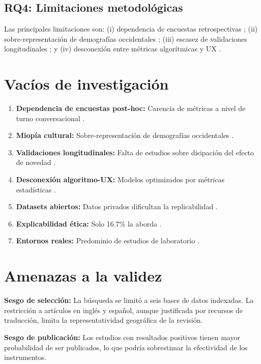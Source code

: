 \documentclass[11pt,twocolumn]{article}
\begin{document}
\subsection{RQ4: Limitaciones metodológicas}

Las principales limitaciones son: (i) dependencia de encuestas retrospectivas \cite{marconi2026}; (ii) sobre-representación de demografías occidentales \cite{folstad2021}; (iii) escasez de validaciones longitudinales \cite{kuhail2022}; y (iv) desconexión entre métricas algorítmicas y UX \cite{jannach2022}.

\section{Vacíos de investigación}

\begin{enumerate}[leftmargin=*, labelsep=5pt, itemsep=2pt]
    \item \textbf{Dependencia de encuestas post-hoc:} Carencia de métricas a nivel de turno conversacional \cite{marconi2026}.
    \item \textbf{Miopía cultural:} Sobre-representación de demografías occidentales \cite{folstad2021, mehra2024}.
    \item \textbf{Validaciones longitudinales:} Falta de estudios sobre disipación del efecto de novedad \cite{kuhail2022, borsci2022}.
    \item \textbf{Desconexión algoritmo-UX:} Modelos optimizados por métricas estadísticas \cite{jannach2022}.
    \item \textbf{Datasets abiertos:} Datos privados dificultan la replicabilidad \cite{fan2023}.
    \item \textbf{Explicabilidad ética:} Solo 16.7\% la aborda \cite{marconi2026}.
    \item \textbf{Entornos reales:} Predominio de estudios de laboratorio \cite{fan2023, thunstrom2024}.
\end{enumerate}

\section{Amenazas a la validez}

\textbf{Sesgo de selección:} La búsqueda se limitó a seis bases de datos indexadas. La restricción a artículos en inglés y español, aunque justificada por recursos de traducción, limita la representatividad geográfica de la revisión.

\textbf{Sesgo de publicación:} Los estudios con resultados positivos tienen mayor probabilidad de ser publicados, lo que podría sobrestimar la efectividad de los instrumentos.
\end{document}
